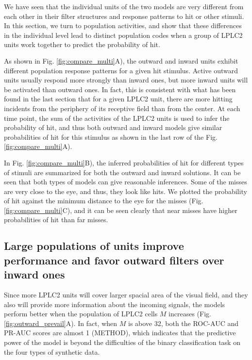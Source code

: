 \documentclass[9pt,lineno]{elife}
\begin{document}
We have seen that the individual units of the two models are very different from each other in their filter structures and response patterns to hit or other stimuli. In this section, we turn to population activities, and show that these differences in the individual level lead to distinct population codes when a group of LPLC2 units work together to predict the probability of hit.

As shown in Fig. \ref{fig:compare_multi}A), the outward and inward units exhibit different population response patterns for a given hit stimulus. Active outward units usually respond more strongly than inward ones, but more inward units will be activated than outward ones. In fact, this is consistent with what has been found in the last section that for a given LPLC2 unit, there are more hitting incidents from the periphery of its receptive field than from the center. At each time point, the sum of the activities of the LPLC2 units is used to infer the probability of hit, and thus both outward and inward models give similar probabilities of hit for this stimulus as shown in the last row of the Fig. \ref{fig:compare_multi}A). 

In Fig. \ref{fig:compare_multi}B), the inferred probabilities of hit for different types of stimuli are summarized for both the outward and inward solutions. It can be seen that both types of models can give reasonable inferences. Some of the misses are very close to the eye, and thus, they look like hits. We plotted the probability of hit against the minimum distance to the eye for the misses (Fig. \ref{fig:compare_multi}C), and it can be seen clearly that near misses have higher probabilities of hit than far misses.


\subsection{Large populations of units improve performance and favor outward filters over inward ones}




Since more LPLC2 units will cover larger spacial area of the visual field, and they also will provide more information about the incoming signals, the models perform better when the population of LPLC2 cells $M$ increases (Fig. \ref{fig:outward_prevail}A). In fact, when $M$ is above 32, both the ROC-AUC and PR-AUC scores are almost 1 (METHOD), which indicates that the predictive power of the model is beyond the difficulties of the binary classification task on the four types of synthetic data.
\end{document}
